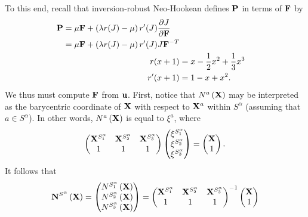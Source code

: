 To this end, recall that inversion-robust Neo-Hookean defines $\mathbf{P}$ in terms of $\mathbf{F}$ by
\begin{subequations}\label{eq:neo_hookean.P}
\begin{align}
\begin{split}
\mathbf{P} & = \mu \mathbf{F} + \left( \lambda r(J) - \mu \right) r'(J) \frac{\partial J}{\partial \mathbf{F}} \\
            & = \mu \mathbf{F} + \left( \lambda r(J) - \mu \right) r'(J) J \mathbf{F}^{-T}
\end{split} \\
r(x + 1) & = x - \frac{1}{2} x^2 + \frac{1}{3} x^3 \\
r'(x + 1) & = 1 - x + x^2.
\end{align}
\end{subequations}
We thus must compute $\mathbf{F}$ from $\mathbf{u}$. First, notice that $N^a \left( \mathbf{X} \right)$ may be interpreted as the barycentric coordinate of $\mathbf{X}$ with respect to $\mathbf{X}^a$ within $S^{\alpha}$ (assuming that $a \in S^{\alpha}$). In other words, $N^a \left( \mathbf{X} \right)$ is equal to $\xi^a$, where
\begin{equation*}
\begin{pmatrix} \mathbf{X}^{S^{\alpha}_1} & \mathbf{X}^{S^{\alpha}_2} & \mathbf{X}^{S^{\alpha}_3} \\ 1 & 1 & 1 \end{pmatrix}
\begin{pmatrix} \xi^{S^{\alpha}_1} \\ \xi^{S^{\alpha}_2} \\ \xi^{S^{\alpha}_3} \end{pmatrix}
=
\begin{pmatrix} \mathbf{X} \\ 1 \end{pmatrix}.
\end{equation*}
It follows that
\begin{equation*}
\mathbf{N}^{S^{\alpha}} \left( \mathbf{X} \right)
=
\begin{pmatrix} N^{S^{\alpha}_1} \left( \mathbf{X} \right) \\ N^{S^{\alpha}_2} \left( \mathbf{X} \right) \\ N^{S^{\alpha}_3} \left( \mathbf{X} \right) \end{pmatrix}
=
\begin{pmatrix} \mathbf{X}^{S^{\alpha}_1} & \mathbf{X}^{S^{\alpha}_2} & \mathbf{X}^{S^{\alpha}_3} \\ 1 & 1 & 1 \end{pmatrix}^{-1}
\begin{pmatrix} \mathbf{X} \\ 1 \end{pmatrix}
\end{equation*}
